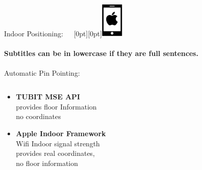\documentclass[11pt]{beamer}
\begin{document}
\begin{frame}{Indoor Positioning:~~~\raisebox{-10pt}[0pt][0pt]{\includegraphics[width=0.08\textwidth]{tech-stack-apple}}}

\framesubtitle{Subtitles can be in lowercase if they are full sentences.}
Automatic Pin Pointing:

  \begin{columns}[T]
  \begin{column}{.6\textwidth}
  \begin{itemize}
  \item  \textbf{TUBIT MSE API} \\
provides floor Information \\
no coordinates

  \item \textbf{Apple Indoor Framework} \\
Wifi Indoor signal strength \\
provides real coordinates, \\
no floor information \\




\end{itemize}
\end{column}
\end{columns}
\end{frame}
\end{document}
